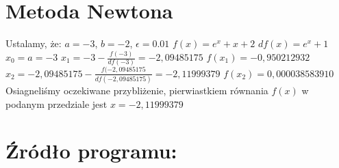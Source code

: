 \documentclass[11pt]{article}
\begin{document}
\section*{Metoda Newtona}
Ustalamy, że: $a = -3$, $b = -2$, $\epsilon = 0.01$\newline
$f(x) = e^{x} + x + 2$\newline
$df(x) = e^{x} + 1$\newline
$x_{0} = a = -3$\newline
$x_{1} = -3 - \frac{f(-3)}{df(-3)} = -2,09485175$\newline
$f(x_{1}) = -0,950212932$\newline
$x_{2} = -2,09485175 - \frac{f(-2,09485175}{df(-2,09485175)} = -2,11999379$\newline
$f(x_{2}) = 0,000038583910$\newline
\newline
Osiagneliśmy oczekiwane przybliżenie, pierwiastkiem równania $f(x)$ w podanym przedziale jest $x= -2,11999379$

\clearpage
\section{Źródło programu:}
\end{document}
